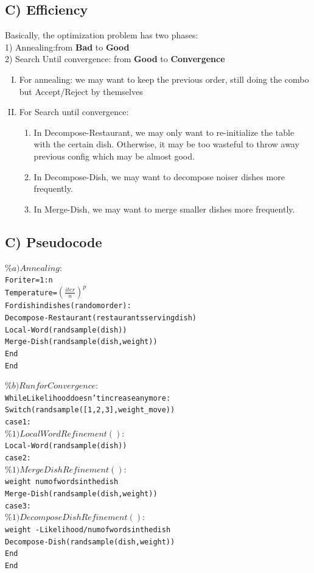 \documentclass{article}
\begin{document}
\begin{spacing}{1.1}
\subsection{C) Efficiency}
Basically, the optimization problem has two phases:\\
1) Annealing:from {\bf Bad} to {\bf Good}\\
2) Search Until convergence: from {\bf Good} to {\bf Convergence}
\begin{enumerate}[(I)]
 \item For annealing: we may want to keep the previous order, still doing the combo but Accept/Reject by themselves
 \item For Search until convergence:\\ 
\begin{enumerate}[(1)]
 \item In Decompose-Restaurant, we may only want to re-initialize the table with the certain dish.
Otherwise, it may be too wasteful to throw away previous config which may be almost good.
 \item In Decompose-Dish, we may want to decompose noiser dishes more frequently.
 \item In Merge-Dish, we may want to merge smaller dishes more frequently.
\end{enumerate}
\end{enumerate}
\subsection{C) Pseudocode}
\begin{alltt}
  \(\%a)Annealing:\)
      For iter=1:n
          Temperature=\((\frac{iter}{n})^p\)
          For dish in {dishes} (random order):
                    Decompose-Restaurant(restaurants serving dish)
                    Local-Word(randsample(dish))
                    Merge-Dish(randsample(dish,weight))
          End
      End

  \(\%b)Run for Convergence:\)
      While Likelihood doesn't increase any more:          
          Switch(randsample([1,2,3],weight_move))
              case 1:
              \(\%1)Local Word Refinement () :\)
                    Local-Word(randsample(dish))
              case 2:
              \(\%1)Merge Dish Refinement () :\)
                    weight~num of words in the dish
                    Merge-Dish(randsample(dish,weight))
              case 3:
              \(\%1)Decompose Dish Refinement () :\)
                    weight~-Likelihood/num of words in the dish
		    Decompose-Dish(randsample(dish,weight))
	  End
      End
\end{alltt}

\end{spacing}
\end{document}
